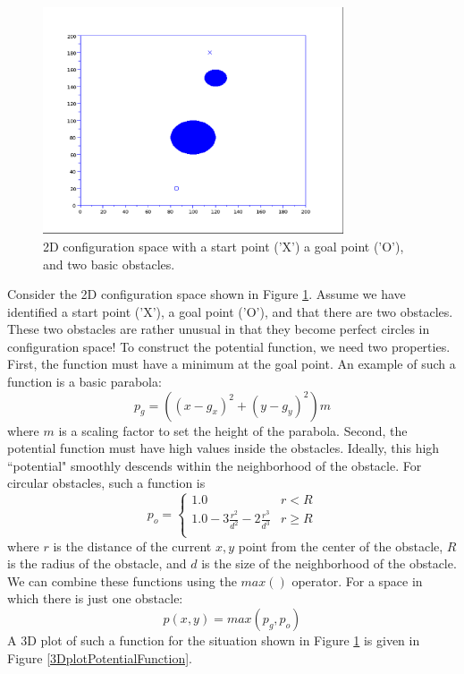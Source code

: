 \begin{figure}
\centering
\includegraphics[width=3.5in]{figs08/schem.eps}
\caption{2D configuration space with a start point ('X') a goal point ('O'), and two basic obstacles.
}\label{SchematicConfigurationSpace}
\end{figure}

Consider the 2D configuration space shown in Figure \ref{SchematicConfigurationSpace}.  Assume we have identified a start point ('X'), a goal point ('O'), and that there are two obstacles.  These two obstacles are rather unusual in that they become perfect circles in configuration space!  To construct the potential function, we need two properties.   First, the function must have a minimum at the goal point.   An example of such a function is a basic parabola:
\[
p_g = \left( (x-g_x)^2 + (y-g_y)^2 \right)m
\]
where $m$ is a scaling factor to set the height of the parabola.   Second, the potential function must have high values inside the obstacles.  Ideally, this high ``potential" smoothly descends within the neighborhood of the obstacle.  For circular obstacles, such a function is 
\[
p_o = \left \{ \begin{array}{cc} 1.0 &  r < R \\  
                           1.0 -  3 \frac{r^2}{d^2} - 2\frac{r^3}{d^3} & r \ge R \\
               \end{array}
      \right .
\]
where $r$ is the distance of the current $x,y$ point from the center of the obstacle, $R$ is the radius of the obstacle, and $d$ is the size of the neighborhood of the obstacle.  We can combine these functions using the $max()$ operator.   For a space in which there is just one obstacle:
\[
p(x,y) = max(p_g,p_o)
\]
A 3D plot of such a function for the situation shown in Figure \ref{SchematicConfigurationSpace} is given in Figure \ref{3DplotPotentialFunction}.

